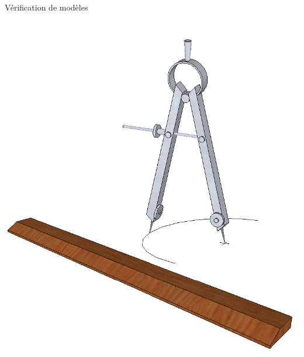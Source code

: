 \documentclass[xcolor={dvipsnames}]{beamer}
\begin{document}
\begin{frame}{Vérification de modèles}
\begin{columns}
\begin{column}{0.5\textwidth}
      \includegraphics[width=\textwidth]{media/compass_ruler.png}
    \end{column}
  \end{columns}
\end{frame}
\end{document}
